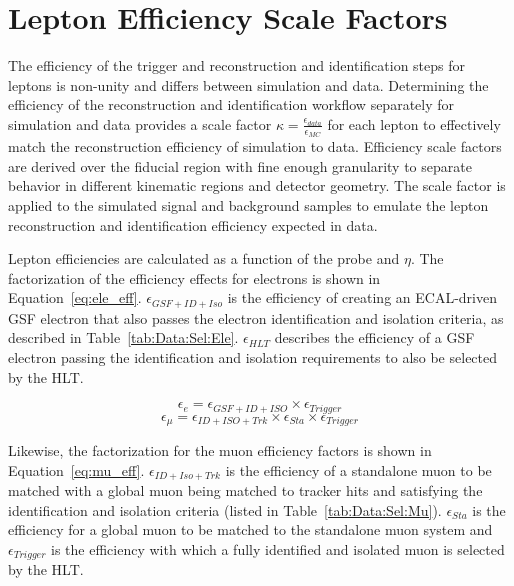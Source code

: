 \chapter{Lepton Efficiency Scale Factors}\label{ch:eff}
The efficiency of the trigger and reconstruction and identification steps for leptons is non-unity and differs between simulation and data. Determining the efficiency of the reconstruction and identification workflow separately for simulation and data provides a scale factor $\kappa = \frac{\epsilon_{data}}{\epsilon_{MC}}$ for each lepton to effectively match the reconstruction efficiency of simulation to data. Efficiency scale factors are derived over the fiducial region with fine enough granularity to separate behavior in different kinematic regions and detector geometry. The scale factor is applied to the simulated signal and background samples to emulate the lepton reconstruction and identification efficiency expected in data.



Lepton efficiencies are calculated as a function of the probe \pt and $\eta$. The factorization of the efficiency effects for electrons is shown in Equation~\ref{eq:ele_eff}. $\epsilon_{GSF+ID+Iso}$ is the efficiency of creating an ECAL-driven GSF electron that also passes the electron identification and isolation criteria, as described in Table~\ref{tab:Data:Sel:Ele}. $\epsilon_{HLT}$ describes the efficiency of a GSF electron passing the identification and isolation requirements to also be selected by the HLT. 

\begin{equation}
  \epsilon_{e} = \epsilon_{GSF+ID+ISO} \times \epsilon_{Trigger}
  \label{eq:ele_eff}
\end{equation}
\begin{equation}
  \epsilon_{\mu} = \epsilon_{ID+ISO+Trk} \times  \epsilon_{Sta} \times \epsilon_{Trigger}
  \label{eq:mu_eff}
\end{equation}

Likewise, the factorization for the muon efficiency factors is shown in Equation~\ref{eq:mu_eff}. $\epsilon_{ID+Iso+Trk}$ is the efficiency of a standalone muon to be matched with a global muon being matched to tracker hits and satisfying the identification and isolation criteria (listed in Table~\ref{tab:Data:Sel:Mu}). $\epsilon_{Sta}$ is the efficiency for a global muon to be matched to the standalone muon system and 
$\epsilon_{Trigger}$ is the efficiency with which a fully identified and isolated muon is selected by the HLT. 



